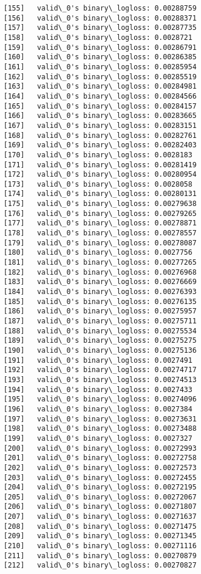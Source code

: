 \documentclass[11pt]{article}
\begin{document}
\begin{Verbatim}[commandchars=\\\{\}]
[155]	valid\_0's binary\_logloss: 0.00288759
[156]	valid\_0's binary\_logloss: 0.00288371
[157]	valid\_0's binary\_logloss: 0.00287735
[158]	valid\_0's binary\_logloss: 0.0028721
[159]	valid\_0's binary\_logloss: 0.00286791
[160]	valid\_0's binary\_logloss: 0.00286385
[161]	valid\_0's binary\_logloss: 0.00285954
[162]	valid\_0's binary\_logloss: 0.00285519
[163]	valid\_0's binary\_logloss: 0.00284981
[164]	valid\_0's binary\_logloss: 0.00284566
[165]	valid\_0's binary\_logloss: 0.00284157
[166]	valid\_0's binary\_logloss: 0.00283665
[167]	valid\_0's binary\_logloss: 0.00283151
[168]	valid\_0's binary\_logloss: 0.00282761
[169]	valid\_0's binary\_logloss: 0.00282403
[170]	valid\_0's binary\_logloss: 0.0028183
[171]	valid\_0's binary\_logloss: 0.00281419
[172]	valid\_0's binary\_logloss: 0.00280954
[173]	valid\_0's binary\_logloss: 0.0028058
[174]	valid\_0's binary\_logloss: 0.00280131
[175]	valid\_0's binary\_logloss: 0.00279638
[176]	valid\_0's binary\_logloss: 0.00279265
[177]	valid\_0's binary\_logloss: 0.00278871
[178]	valid\_0's binary\_logloss: 0.00278557
[179]	valid\_0's binary\_logloss: 0.00278087
[180]	valid\_0's binary\_logloss: 0.0027756
[181]	valid\_0's binary\_logloss: 0.00277265
[182]	valid\_0's binary\_logloss: 0.00276968
[183]	valid\_0's binary\_logloss: 0.00276669
[184]	valid\_0's binary\_logloss: 0.00276393
[185]	valid\_0's binary\_logloss: 0.00276135
[186]	valid\_0's binary\_logloss: 0.00275957
[187]	valid\_0's binary\_logloss: 0.00275711
[188]	valid\_0's binary\_logloss: 0.00275534
[189]	valid\_0's binary\_logloss: 0.00275275
[190]	valid\_0's binary\_logloss: 0.00275136
[191]	valid\_0's binary\_logloss: 0.0027491
[192]	valid\_0's binary\_logloss: 0.00274717
[193]	valid\_0's binary\_logloss: 0.00274513
[194]	valid\_0's binary\_logloss: 0.0027433
[195]	valid\_0's binary\_logloss: 0.00274096
[196]	valid\_0's binary\_logloss: 0.0027384
[197]	valid\_0's binary\_logloss: 0.00273631
[198]	valid\_0's binary\_logloss: 0.00273488
[199]	valid\_0's binary\_logloss: 0.0027327
[200]	valid\_0's binary\_logloss: 0.00272993
[201]	valid\_0's binary\_logloss: 0.00272758
[202]	valid\_0's binary\_logloss: 0.00272573
[203]	valid\_0's binary\_logloss: 0.00272455
[204]	valid\_0's binary\_logloss: 0.00272195
[205]	valid\_0's binary\_logloss: 0.00272067
[206]	valid\_0's binary\_logloss: 0.00271807
[207]	valid\_0's binary\_logloss: 0.00271637
[208]	valid\_0's binary\_logloss: 0.00271475
[209]	valid\_0's binary\_logloss: 0.00271345
[210]	valid\_0's binary\_logloss: 0.00271116
[211]	valid\_0's binary\_logloss: 0.00270879
[212]	valid\_0's binary\_logloss: 0.00270827

\end{Verbatim}
\end{document}
